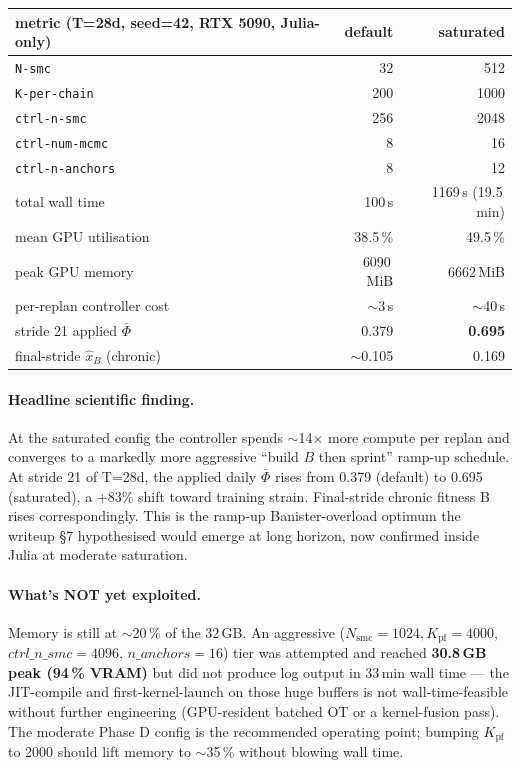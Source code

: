 \documentclass[11pt,a4paper]{article}
\begin{document}
\begin{center}
\begin{tabular}{lrr}
  \toprule
  metric (T=28d, seed=42, RTX 5090, Julia-only)
                                       & default    & saturated \\
  \midrule
  \texttt{N-smc}                       & 32         & 512       \\
  \texttt{K-per-chain}                 & 200        & 1000      \\
  \texttt{ctrl-n-smc}                  & 256        & 2048      \\
  \texttt{ctrl-num-mcmc}               & 8          & 16        \\
  \texttt{ctrl-n-anchors}              & 8          & 12        \\
  \midrule
  total wall time                      & 100\,s     & 1169\,s (19.5\,min) \\
  mean GPU utilisation                 & 38.5\,\%   & 49.5\,\%  \\
  peak GPU memory                      & 6090\,MiB  & 6662\,MiB \\
  per-replan controller cost           & $\sim$3\,s & $\sim$40\,s \\
  stride 21 applied $\bar\Phi$         & 0.379      & \textbf{0.695} \\
  final-stride $\hat x_B$ (chronic)    & $\sim$0.105 & 0.169    \\
  \bottomrule
\end{tabular}
\end{center}

\paragraph{Headline scientific finding.} At the saturated config the
controller spends $\sim$14$\times$ more compute per replan and converges
to a markedly more aggressive ``build $B$ then sprint'' ramp-up
schedule. At stride 21 of T=28d, the applied daily $\bar\Phi$ rises from
0.379 (default) to 0.695 (saturated), a $+83\%$ shift toward training
strain. Final-stride chronic fitness B rises correspondingly. This is
the ramp-up Banister-overload optimum the writeup §7 hypothesised
would emerge at long horizon, now confirmed inside Julia at moderate
saturation.

\paragraph{What's NOT yet exploited.} Memory is still at $\sim$20\,\%
of the 32\,GB. An aggressive
($N_{\text{smc}}=1024, K_{\text{pf}}=4000$, $\mathit{ctrl\_n\_smc}=4096$,
$\mathit{n\_anchors}=16$) tier was attempted and reached
\textbf{30.8\,GB peak (94\,\% VRAM)} but did not produce log output in
33\,min wall time --- the JIT-compile and first-kernel-launch on those
huge buffers is not wall-time-feasible without further engineering
(GPU-resident batched OT or a kernel-fusion pass). The moderate
Phase D config is the recommended operating point; bumping
$K_{\text{pf}}$ to 2000 should lift memory to $\sim$35\,\% without
blowing wall time.
\end{document}
